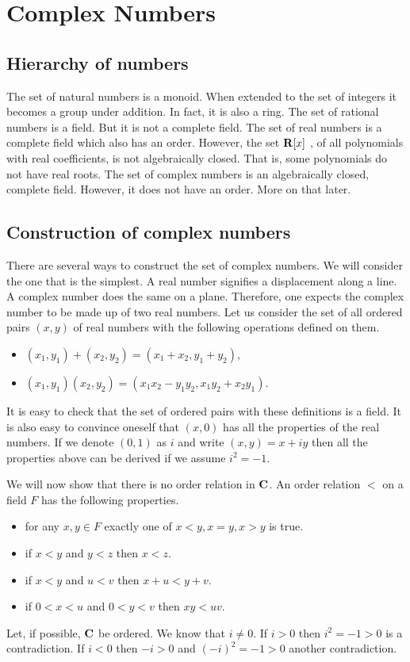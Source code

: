\chapter{Complex Numbers}\label{c1}
\section{Hierarchy of numbers}\label{c1s1}
The set of natural numbers is a monoid. When extended to the set of integers
it becomes a group under addition. In fact, it is also a ring. The set of
rational numbers is a field. But it is not a complete field. The set of real
numbers is a complete field which also has an order. However, the set $\mathbf{R}[x]$
, of all polynomials with real coefficients, is not algebraically closed. That 
is, some polynomials do not have real roots. The set of complex numbers is an
algebraically closed, complete field. However, it does not have an order. More
on that later.

\section{Construction of complex numbers}\label{c1s2}
There are several ways to construct the set of complex numbers. We will consider
the one that is the simplest. A real number signifies a displacement along a 
line. A complex number does the same on a plane. Therefore, one expects the
complex number to be made up of two real numbers. Let us consider the set of 
all ordered pairs $(x, y)$ of real numbers with the following operations defined
on them.
\begin{itemize}
\item $(x_1, y_1) + (x_2, y_2) = (x_1 + x_2, y_1 + y_2)$,
\item $(x_1, y_1)(x_2, y_2) = (x_1x_2 - y_1y_2, x_1y_2 + x_2y_1)$.
\end{itemize}
It is easy to check that the set of ordered pairs with these definitions is a
field. It is also easy to convince oneself that $(x, 0)$ has all the properties
of the real numbers. If we denote $(0, 1)$ as $i$ and write $(x, y) = x + iy$
then all the properties above can be derived if we assume $i^2 = -1$. 

We will now show that there is no order relation in $\mathbf{C}$. An order relation
$<$ on a field $F$ has the following properties.
\begin{itemize}
\item for any $x, y \in F$ exactly one of $x < y, x = y, x > y$ is true.
\item if $x < y$ and $y < z$ then $x < z$.
\item if $x < y$ and $u < v$ then $x + u < y + v$.
\item if $0 < x < u$ and $0 < y < v$ then $xy < uv$.
\end{itemize}
Let, if possible, $\mathbf{C}$ be ordered. We know that $i \ne 0$. If $i > 0$ then
$i^2 = -1 > 0$ is a contradiction. If $i < 0$ then $-i > 0$ and $(-i)^2 = -1 
> 0$ another contradiction.

